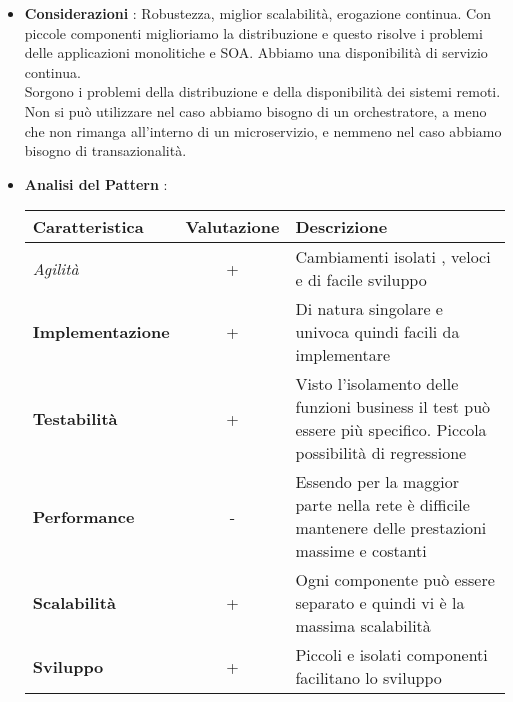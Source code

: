 {{{\begin{itemize}
					L'altro percorso evolutivo che ha portato al modello architetturale a microservizi proviene da problemi rilevati con le applicazioni di attuazione dell'architettura modello orientato ai servizi (\textit{SOA}). Mentre il modello SOA è molto potente e offre livelli senza precedenti di astrazione, connettività eterogenea, orchestrazione dei servizi, e la promessa di allineare gli obiettivi di business con funzionalità IT, è comunque complesso, costoso, onnipresente, difficile da capire e mettere in atto, e di solito è eccessivo per la maggior parte delle applicazioni.\\
					\item \textbf{Considerazioni} : Robustezza, miglior scalabilità, erogazione continua. Con piccole componenti miglioriamo la distribuzione e questo risolve i problemi delle applicazioni monolitiche e SOA. Abbiamo una disponibilità di servizio continua.\\
					Sorgono i problemi della distribuzione e della disponibilità dei sistemi remoti. Non si può utilizzare nel caso abbiamo bisogno di un orchestratore, a meno che non rimanga all'interno di un microservizio, e nemmeno nel caso abbiamo bisogno di transazionalità.
					\item \textbf{Analisi del Pattern} :
					\small %
					{\renewcommand\arraystretch{1.2} %
						\begin{tabular}{|l|c|l|}
							\hline
							{\textbf{Caratteristica}}&{\textbf{Valutazione}}&{\textbf{Descrizione}}\\
							\hline
							\textit{Agilità} & + & Cambiamenti isolati , veloci e di facile sviluppo \\
							\hline
							\textbf{Implementazione} & + & Di natura singolare e univoca quindi facili da implementare \\
							\hline
							\textbf{Testabilità} & + & Visto l'isolamento delle funzioni business il test può essere più specifico. Piccola possibilità di regressione \\
							\hline
							\textbf{Performance} & - & Essendo per la maggior parte nella rete è difficile mantenere delle prestazioni massime e costanti \\
							\hline
							\textbf{Scalabilità} & + & Ogni componente può essere separato e quindi vi è la massima scalabilità \\
							\hline
							\textbf{Sviluppo} & + & Piccoli e isolati componenti facilitano lo sviluppo \\
							\hline
						\end{tabular}
					}
				\end{itemize}
		}
}}
